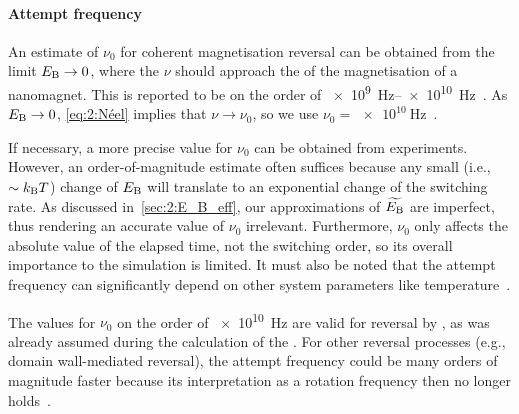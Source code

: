 \paragraph{Attempt frequency}
An estimate of $\nu_0$ for coherent magnetisation reversal can be obtained from the limit $E_\mathrm{B} \rightarrow 0$, where the  $\nu$ should approach the  of the magnetisation of a nanomagnet.
This is reported to be on the order of \SIrange{e9}{e10}{\hertz}~\cite{BrownThermalFluctuations,bean1959superparamagnetism}.
As $E_\mathrm{B} \rightarrow 0$, \cref{eq:2:Néel} implies that $\nu \rightarrow \nu_0$, so we use $\nu_0=\SI{e10}{\hertz}$~\cite{JM_Masterproef}. \par %
If necessary, a more precise value for $\nu_0$ can be obtained from experiments.
However, an order-of-magnitude estimate often suffices because any small (i.e., $\sim \kBT$) change of $E_\mathrm{B}$ will translate to an exponential change of the switching rate.
As discussed in~\cref{sec:2:E_B_eff}, our approximations of $\widetilde{E_\mathrm{B}}$ are imperfect, thus rendering an accurate value of $\nu_0$ irrelevant.
Furthermore, $\nu_0$ only affects the absolute value of the elapsed time, not the switching order, so its overall importance to the simulation is limited.
It must also be noted that the attempt frequency can significantly depend on other system parameters like temperature~\cite{AttemptFreqTemperature}. \par %
The values for $\nu_0$ on the order of \SI{e10}{\hertz} are valid for reversal by , as was already assumed during the calculation of the .
For other reversal processes (e.g., domain wall-mediated reversal), the attempt frequency could be many orders of magnitude faster because its interpretation as a rotation frequency then no longer holds~\cite{ArrheniusPrefactor}. %

